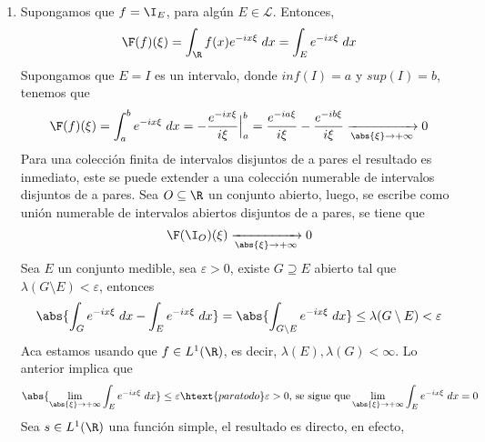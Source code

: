 \documentclass{article}
\begin{document}
\begin{enumerate}
    \item Supongamos que $f=\I_{E}$, para algún $E\in\mathcal{L}$. Entonces,
    \begin{equation*}
        \F(f)(\xi)=\int_{\R}f(x)e^{-ix\xi}\hspace{1mm}dx=\int_{E}e^{-ix\xi}\hspace{1mm}dx
    \end{equation*}
    Supongamos que $E=I$ es un intervalo, donde $inf(I)=a$ y $sup(I)=b$, tenemos que
    \begin{equation*}
        \F(f)(\xi)=\int_{a}^{b}e^{-ix\xi}\hspace{1mm}dx=-\frac{e^{-ix\xi}}{i\xi}\Big|_{a}^{b}
        =\frac{e^{-ia\xi}}{i\xi}-\frac{e^{-ib\xi}}{i\xi}\xrightarrow[\abs{\xi}\to+\infty]{}0
    \end{equation*}
    Para una colección finita de intervalos disjuntos de a pares el resultado es inmediato, este
    se puede extender a una colección numerable de intervalos disjuntos de a pares. Sea 
    $O\subseteq\R$ un conjunto abierto, luego, se escribe como unión numerable de intervalos 
    abiertos disjuntos de a pares, se tiene que
    \begin{equation*}
        \F(\I_{O})(\xi)\xrightarrow[\abs{\xi}\to+\infty]{}0
    \end{equation*}
    Sea $E$ un conjunto medible, sea $\varepsilon>0$, existe $G\supseteq E$ abierto tal que 
    $\lambda(G\setminus E)<\varepsilon$, entonces
    \begin{equation*}
        \abs{\int_{G}e^{-ix\xi}\hspace{1mm}dx-\int_{E}e^{-ix\xi}\hspace{1mm}dx}
        =\abs{\int_{G\setminus E}e^{-ix\xi}\hspace{1mm}dx}\leq\lambda(G\setminus E)<\varepsilon
    \end{equation*}
    Aca estamos usando que $f\in L^{1}(\R)$, es decir, $\lambda(E),\lambda(G)<\infty$. Lo anterior 
    implica que 
    \begin{equation*}
        \abs{\lim\limits_{\abs{\xi}\to+\infty}\int_{E}e^{-ix\xi}\hspace{1mm}dx}\leq\varepsilon
        \htext{para todo}\varepsilon>0\text{, se sigue que}
        \lim\limits_{\abs{\xi}\to+\infty}\int_{E}e^{-ix\xi}\hspace{1mm}dx=0
    \end{equation*}
    Sea $s\in L^{1}(\R)$ una función simple, el resultado es directo, en efecto,
    \begin{equation*}

\end{equation*}
\end{enumerate}
\end{document}
